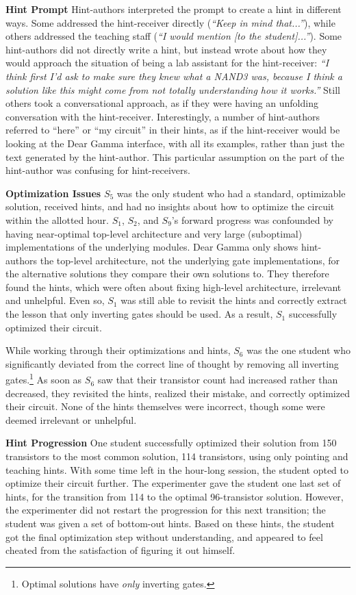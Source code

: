 {\bf Hint Prompt} Hint-authors interpreted the prompt to create a hint in different ways. Some addressed the hint-receiver directly ({\it ``Keep in mind that...''}), while others addressed the teaching staff ({\it ``I would mention [to the student]...''}). Some hint-authors did not directly write a hint, but instead wrote about how they would approach the situation of being a lab assistant for the hint-receiver: {\it ``I think first I'd ask to make sure they knew what a NAND3 was, because I think a solution like this might come from not totally understanding how it works.''} Still others took a conversational approach, as if they were having an unfolding conversation with the hint-receiver. Interestingly, a number of hint-authors referred to ``here'' or ``my circuit'' in their hints, as if the hint-receiver would be looking at the Dear Gamma interface, with all its examples, rather than just the text generated by the hint-author. This particular assumption on the part of the hint-author was confusing for hint-receivers.

{\bf Optimization Issues} $S_5$ was the only student who had a standard, optimizable solution, received hints, and had no insights about how to optimize the circuit within the allotted hour. $S_1$, $S_2$, and $S_9$'s forward progress was confounded by having near-optimal top-level architecture and very large (suboptimal) implementations of the underlying modules. Dear Gamma only shows hint-authors the top-level architecture, not the underlying gate implementations, for the alternative solutions they compare their own solutions to. They therefore found the hints, which were often about fixing high-level architecture, irrelevant and unhelpful. Even so, $S_1$ was still able to revisit the hints and correctly extract the lesson that only inverting gates should be used. As a result, $S_1$ successfully optimized their circuit.

While working through their optimizations and hints, $S_6$ was the one student who significantly deviated from the correct line of thought by removing all inverting gates.\footnote{Optimal solutions have {\it only} inverting gates.} As soon as $S_6$ saw that their transistor count had increased rather than decreased, they revisited the hints, realized their mistake, and correctly optimized their circuit. None of the hints themselves were incorrect, though some were deemed irrelevant or unhelpful.

{\bf Hint Progression} One student successfully optimized their solution from 150 transistors to the most common solution, 114 transistors, using only pointing and teaching hints. With some time left in the hour-long session, the student opted to optimize their circuit further. The experimenter gave the student one last set of hints, for the transition from 114 to the optimal 96-transistor solution. However, the experimenter did not restart the progression for this next transition; the student was given a set of bottom-out hints. Based on these hints, the student got the final optimization step without understanding, and appeared to feel cheated from the satisfaction of figuring it out himself. 

